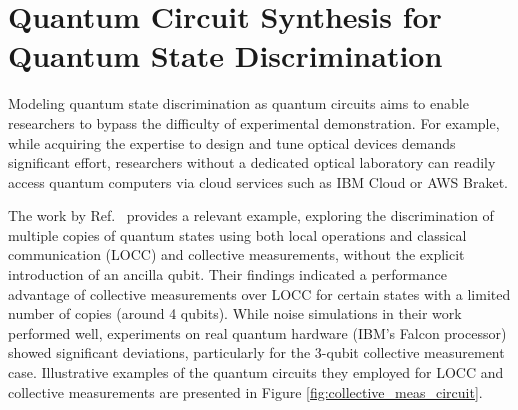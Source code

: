 
\chapter{Quantum Circuit Synthesis for Quantum State Discrimination}
\label{chap:qc_qsd}

Modeling quantum state discrimination as quantum circuits aims to enable
researchers to bypass the difficulty of experimental demonstration.
For example, while acquiring the expertise to design and tune optical devices
demands significant effort, researchers without a dedicated optical laboratory
can readily access quantum computers via cloud services such as IBM Cloud or AWS Braket.

The work by Ref.~\cite{RN87} provides a relevant example, exploring the
discrimination of multiple copies of quantum states using both local operations
and classical communication (LOCC) and collective measurements, without the
explicit introduction of an ancilla qubit.
Their findings indicated a performance advantage of collective measurements
over LOCC for certain states with a limited number of copies (around 4 qubits).
While noise simulations in their work performed well, experiments on real
quantum hardware (IBM's Falcon processor) showed significant deviations,
particularly for the 3-qubit collective measurement case.
Illustrative examples of the quantum circuits they employed for LOCC and
collective measurements are presented in Figure \ref{fig:collective_meas_circuit}.

